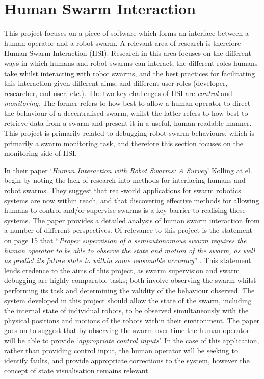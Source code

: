 
\section{Human Swarm Interaction} \label{HumanSwarmInteraction}
This project focuses on a piece of software which forms an interface between a human operator and a robot swarm. A relevant area of research is therefore Human-Swarm Interaction (HSI). Research in this area focuses on the different ways in which humans and robot swarms can interact, the different roles humans take whilst interacting with robot swarms, and the best practices for facilitating this interaction given different aims, and different user roles (developer, researcher, end user, etc.). The two key challenges of HSI are \textit{control} and \textit{monitoring}. The former refers to how best to allow a human operator to direct the behaviour of a decentralised swarm, whilst the latter refers to how best to retrieve data from a swarm and present it in a useful, human readable manner. This project is primarily related to debugging robot swarm behaviours, which is primarily a swarm monitoring task, and therefore this section focuses on the monitoring side of HSI.

In their paper `\textit{Human Interaction with Robot Swarms: A Survey}' \cite{Kolling:2016} Kolling at el. begin by noting the lack of research into methods for interfacing humans and robot swarms. They suggest that real-world applications for swarm robotics systems are now within reach, and that discovering effective methods for allowing humans to control and/or supervise swarms is a key barrier to realising these systems. The paper \cite{Kolling:2016} provides a detailed analysis of human swarm interaction from a number of different perspectives. Of relevance to this project is the statement on page 15 that ``\textit{Proper supervision of a semiautonomous swarm requires the human operator to be able to observe the state and motion of the swarm, as well as predict its future state to within some reasonable accuracy}'' \cite{Kolling:2016}. This statement lends credence to the aims of this project, as swarm supervision and swarm debugging are highly comparable tasks; both involve observing the swarm whilst performing its task and determining the validity of the behaviour observed. The system developed in this project should allow the state of the swarm, including the internal state of individual robots, to be observed simultaneously with the physical positions and motions of the robots within their environment. The paper \cite{Kolling:2016} goes on to suggest that by observing the swarm over time the human operator will be able to provide `\textit{appropriate control inputs}'. In the case of this application, rather than providing control input, the human operator will be seeking to identify faults, and provide appropriate corrections to the system, however the concept of state visualisation remains relevant.

